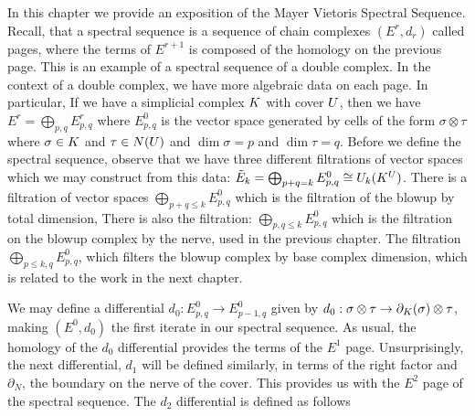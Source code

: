 In this chapter we provide an exposition of the Mayer Vietoris Spectral Sequence. Recall, that a spectral sequence is a sequence of chain complexes $(E^r, d_r)$ called pages, where the terms of $E^{r+1}$ is composed of the homology on the previous page. This is an example of a spectral sequence of a double complex. In the context of a double complex, we have more algebraic data on each page. In particular, If we have a simplicial complex $K$ with cover $U$, then we have $E^r = \bigoplus_{p,q} E^r_{p,q}$ where $E^0_{p,q}$ is the vector space generated by cells of the form $\sigma \otimes \tau$ where $\sigma \in K$ and $\tau \in N(U)$ and $\dim{\sigma} = p$ and $\dim{\tau} = q$. Before we define the spectral sequence, observe that we have three different filtrations of vector spaces which we may construct from this data: $\tilde{E}_k = \bigoplus_{p+q=k} E^0_{p,q} \cong U_k(K^U)$. There is a filtration of vector spaces $\bigoplus_{p+q \leq k} E^0_{p,q}$ which is the filtration of the blowup by total dimension, There is also the filtration: $\bigoplus_{p, q \leq k} E^0_{p,q}$ which is the filtration on the blowup complex by the nerve, used in the previous chapter. The filtration $\bigoplus_{p \leq k, q} E^0_{p,q}$, which filters the blowup complex by base complex dimension, which is related to the work in the next chapter.

We may define a differential $d_0: E^0_{p,q} \rightarrow E^0_{p-1,q}$ given by $d_0: \sigma \otimes \tau \rightarrow \partial_K(\sigma) \otimes \tau$, making $(E^0, d_0)$ the first iterate in our spectral sequence. As usual, the homology of the $d_0$ differential provides the terms of the $E^1$ page. Unsurprisingly, the next differential, $d_1$ will be defined similarly, in terms of the right factor and $\partial_N$, the boundary on the nerve of the cover. This provides us with the $E^2$ page of the spectral sequence. The $d_2$ differential is defined as follows